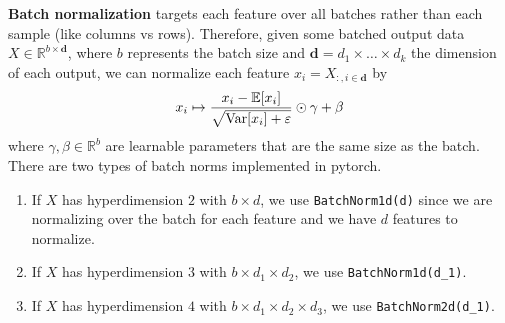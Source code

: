   \begin{definition}
    \label{def:batch-norm}
    \textbf{Batch normalization} targets each feature over all batches rather than each sample (like columns vs rows). Therefore, given some batched output data $X \in \mathbb{R}^{b \times \mathbf{d}}$, where $b$ represents the batch size and $\mathbf{d} = d_1 \times \ldots \times d_k$ the dimension of each output, we can normalize each feature $x_i = X_{:,i \in \mathbf{d}}$ by 
    \begin{equation}
      x_i \mapsto \frac{x_i - \mathbb{E}[x_i]}{\sqrt{\operatorname{Var}[x_i] + \varepsilon}} \odot \gamma + \beta
    \end{equation}
    where $\gamma, \beta \in \mathbb{R}^b$ are learnable parameters that are the same size as the batch. There are two types of batch norms implemented in pytorch. 
    \begin{enumerate}
      \item If $X$ has hyperdimension $2$ with $b \times d$, we use \texttt{BatchNorm1d(d)} since we are normalizing over the batch for each feature and we have $d$ features to normalize. 
      \item If $X$ has hyperdimension $3$ with $b \times d_1 \times d_2$, we use \texttt{BatchNorm1d(d\_1)}. 
      \item If $X$ has hyperdimension $4$ with $b \times d_1 \times d_2 \times d_3$, we use \texttt{BatchNorm2d(d\_1)}. 
    \end{enumerate}
  \end{definition}

